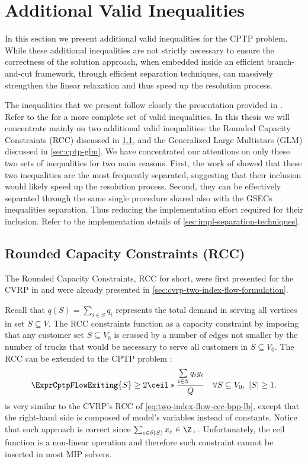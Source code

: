 \section{Additional Valid Inequalities}
\label{sec:cptp-additional-valid-inequalities}

In this section we present additional valid inequalities for the CPTP problem.
While these additional inequalities are not strictly necessary
to ensure the correctness of the solution approach,
when embedded inside an efficient branch-and-cut framework,
through efficient separation techniques,
can massively strengthen the linear relaxation and thus speed up the resolution process.

The inequalities that we present follow closely the presentation provided in \textcite{jepsen2014}.
Refer to the \textcite{jepsen2014} for a more complete set of valid inequalities.
In this thesis we will concentrate mainly on two additional valid inequalities:
the Rounded Capacity Constraints (RCC) discussed in \cref{sec:cptp-rcc},
and the Generalized Large Multistars (GLM) discussed in \cref{sec:cptp-glm}.
We have concentrated our attentions on only these two sets of inequalities
for two main reasons.
First, the work of \textcite{jepsen2014} showed that these two inequalities are the most frequently
separated, suggesting that their inclusion would likely speed up the resolution process.
Second,
they can be effectively separated through the same single procedure
shared also with the GSECs inequalities separation.
Thus reducing the implementation effort required for their inclusion.
Refer to the implementation details of \cref{sec:impl-separation-techniques}.

\subsection{Rounded Capacity Constraints (RCC)}
\label{sec:cptp-rcc}

The Rounded Capacity Constraints, RCC for short, were first presented
for the CVRP  in \textcite{laporte1983}
and were already presented in \cref{sec:cvrp-two-index-flow-formulation}.

Recall that $q(S) = \sum_{i \in S} q_i$ represents
the total demand in serving all vertices in set $S \subseteq V$.
The RCC constraints function as a capacity constraint
by imposing that any customer set $S \subseteq V_0$ is crossed by a number of edges
not smaller by the number of trucks that would be necessary to serve all customers in $S \subseteq V_0$.
The RCC can be extended to the CPTP problem \parencite{jepsen2014}:
\begin{equation}
	\label{eq:cptp-rcc-inequality-original}
	\ExprCptpFlowExiting{S} \ge 2 \ceil*{\frac{\sum\limits_{i \in S} q_i y_i}{Q}} \quad \forall S \subseteq V_0,\ |S| \ge 1.
\end{equation}
is very similar to the CVRP's RCC of \cref{eq:two-index-flow-ccc-bpp-lb},
except that the right-hand side is composed of model's variables instead of constants.
Notice that such approach is correct since $\sum_{e \in \delta(S)} x_e \in \Z_+$.
Unfortunately, the ceil function is a non-linear operation and therefore
such constraint cannot be inserted in most MIP solvers.

